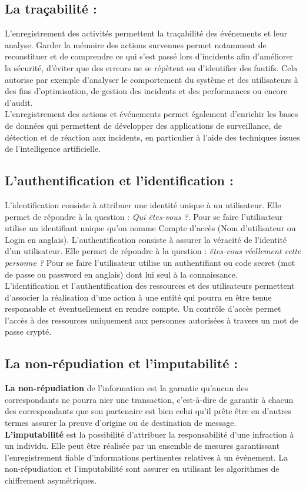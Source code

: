 \subsection{La traçabilité : }
L’enregistrement des activités permettent la traçabilité des événements et leur analyse. Garder la mémoire des actions survenues permet notamment de reconstituer et de comprendre ce qui s’est passé lors d’incidents afin d’améliorer la sécurité, d’éviter que des erreurs ne se répètent ou d’identifier des fautifs. Cela autorise par exemple d’analyser le comportement du système et des utilisateurs à des fins d’optimisation, de gestion des incidents et des performances ou encore d’audit.\\
L’enregistrement des actions et événements permet également d’enrichir les bases de données qui permettent de développer des applications de surveillance, de détection et de réaction aux incidents, en particulier à l’aide des techniques issues de l’intelligence artificielle.
\subsection{L’authentification et l’identification :}
L'identification consiste à attribuer une identité unique à un utilisateur. Elle permet de répondre à la question : \textit{Qui êtes-vous ?}\cite{ref5}. Pour se faire l'utilisateur utilise un identifiant unique qu’on nomme Compte d'accès (Nom d'utilisateur ou Login en anglais). L’authentification consiste à assurer la véracité de l'identité d'un utilisateur. Elle permet de répondre à la question : \textit{êtes-vous réellement cette personne ?} \cite{ref5} Pour se faire l’utilisateur utilise un authentifiant ou code secret (mot de passe ou password en anglais) dont lui seul à la connaissance.\\
L’identification et l’authentification des ressources et des utilisateurs permettent d’associer la réalisation d’une action à une entité qui pourra en être tenue responsable et éventuellement en rendre compte. Un contrôle d'accès permet l'accès à des ressources uniquement aux personnes autorisées à travers un mot de passe crypté.
\subsection{La non-répudiation et l’imputabilité : }
\textbf{La non-répudiation} de l'information est la garantie qu'aucun des correspondants ne pourra nier une transaction, c'est-à-dire de garantir à chacun des correspondants que son partenaire est bien celui qu’il prête être en d’autres termes assurer la preuve d’origine ou de destination de message.\\
\textbf{L’imputabilité} est la possibilité d’attribuer la responsabilité d’une infraction à un individu. Elle peut être réalisée par un ensemble de mesures garantissant l’enregistrement fiable d’informations pertinentes relatives à un événement. La non-répudiation et l’imputabilité sont assurer en utilisant les algorithmes de chiffrement asymétriques.
